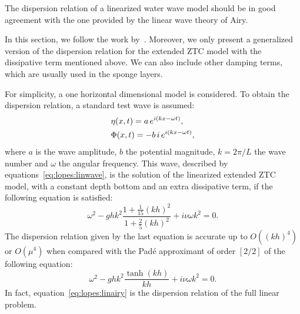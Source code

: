 The dispersion relation  of a linearized
water wave model should be in good agreement with the one provided by
the linear wave theory of Airy.

In this section, we follow the work by~\citet{DutykhDias2007}.
Moreover, we only present a generalized version of the dispersion
relation for the extended ZTC model with the dissipative term
mentioned above.  We can also include other damping terms, which are
usually used in the sponge layers.

For simplicity, a one horizontal dimensional model is considered.  To
obtain the dispersion relation, a standard test wave is assumed:
\begin{subequations}
  \label{eq:lopes:linwave}
  \begin{align}
    &\eta(x,t)=a\,e^{i(kx-\omega
      t)},\vspace{0.3cm}\\
    &\Phi(x,t)=-b\,i\,e^{i(kx-\omega t)},
  \end{align}
\end{subequations}
where $a$ is the wave amplitude, $b$ the potential magnitude,
$k=2\pi/L$ the wave number and $\omega$ the angular frequency.  This
wave, described by equations~\eqref{eq:lopes:linwave}, is the solution
of the linearized extended ZTC model, with a constant depth bottom and
an extra dissipative term, if the following equation is satisfied:
\begin{equation}
  \label{eq:lopes:dissdisp}
  \omega^2-ghk^2\frac{1+\frac{1}{15}(kh)^2}{1 +
  \frac{2}{5}(kh)^2} + i\nu\omega k^2=0.
\end{equation}
The dispersion relation given by the last equation is accurate up to
$O((kh)^4)$ or $O(\mu^4)$ when compared with the Pad\'{e} approximant
of order $[2/2]$ of the following equation:
\begin{equation}
  \label{eq:lopes:linairy}
  \omega^2-ghk^2\frac{\tanh(kh)}{kh} + i\nu\omega k^2 = 0.
\end{equation}
In fact, equation~\eqref{eq:lopes:linairy} is the dispersion relation
of the full linear problem.

